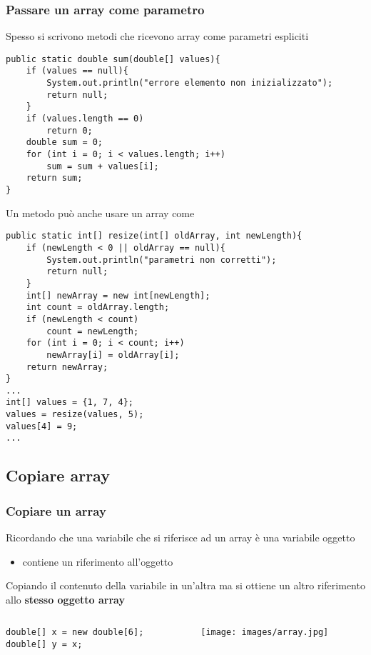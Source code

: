 \begin{frame}[fragile]
\frametitle{Passare un array come parametro}
\begin{block}
Spesso si scrivono metodi che ricevono array come parametri espliciti
\end{block}
\begin{lstlisting}
public static double sum(double[] values){
    if (values == null){
        System.out.println("errore elemento non inizializzato");
        return null;
    }
    if (values.length == 0)
        return 0;
    double sum = 0;
    for (int i = 0; i < values.length; i++)
        sum = sum + values[i];
    return sum;
}
\end{lstlisting}
\end{frame}

\begin{frame}[fragile]
\begin{block}{}
Un metodo può anche usare un array come \textbf{} 
\end{block}
\begin{lstlisting}
public static int[] resize(int[] oldArray, int newLength){ 
    if (newLength < 0 || oldArray == null){
        System.out.println("parametri non corretti");
        return null;
    }
    int[] newArray = new int[newLength];
    int count = oldArray.length;
    if (newLength < count)
        count = newLength;
    for (int i = 0; i < count; i++)
        newArray[i] = oldArray[i];
    return newArray;
}
...
int[] values = {1, 7, 4};
values = resize(values, 5);
values[4] = 9;
...
\end{lstlisting}
\end{frame}

\subsection*{Copiare array}
\begin{frame}[fragile]
\frametitle{Copiare un array}
\begin{block}{}
Ricordando che una variabile che si riferisce ad un array è una variabile oggetto
\begin{itemize}
\item contiene un riferimento all'oggetto
\end{itemize}
\end{block}
\begin{block}{}
Copiando il contenuto della variabile in un'altra \textbf{} ma si ottiene un altro riferimento 
allo \textbf{\alert{stesso oggetto array}}
\end{block}
\begin{columns}
\begin{column}{.5\textwidth}
\begin{lstlisting}
double[] x = new double[6]; 
double[] y = x;
\end{lstlisting}
\end{column}
\begin{column}{0.5\textwidth}
\centering
\texttt{[image: images/array.jpg]}
\end{column}
\end{columns}
\end{frame}

